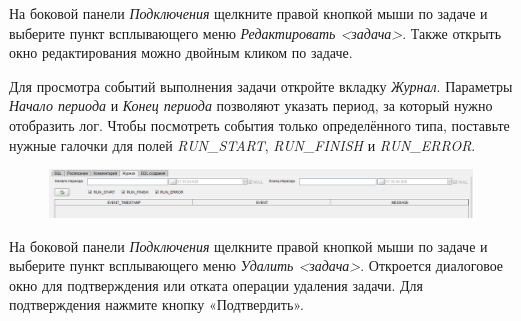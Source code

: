 
На боковой панели \textit{Подключения} щелкните правой кнопкой мыши по задаче и выберите пункт всплывающего меню \textit{Редактировать <задача>}. Также открыть окно редактирования можно двойным кликом по задаче.

Для просмотра событий выполнения задачи откройте вкладку \textit{Журнал}. Параметры \textit{Начало периода} и \textit{Конец периода} позволяют указать период, за который нужно отобразить лог. Чтобы посмотреть события только определённого типа, поставьте нужные галочки для полей \textit{RUN\_START}, \textit{RUN\_FINISH} и \textit{RUN\_ERROR}.
\begin{figure}[H]
	\centering
	\includegraphics[width = 0.6\linewidth]{img/create_job_log.png}
\end{figure}


На боковой панели \textit{Подключения} щелкните правой кнопкой мыши по задаче и выберите пункт всплывающего меню \textit{Удалить <задача>}. Откроется  диалоговое окно для подтверждения или отката операции удаления задачи. Для подтверждения нажмите кнопку «Подтвердить».

\newpage
